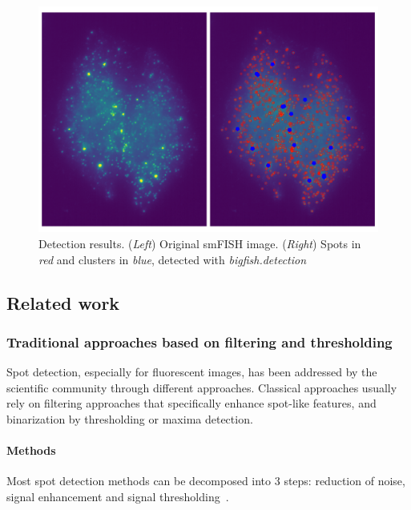 \begin{figure}[]
    \centering
    \includegraphics[width=1\textwidth]{figures/chapter2/cluster_detection_results}
	\caption[Example of spot detection results]{Detection results.
	(\textit{Left}) Original smFISH image.
	(\textit{Right}) Spots in \textit{red} and clusters in \textit{blue}, detected with \emph{bigfish.detection}}
    \label{fig:detection_results}
\end{figure}

\subsection{Related work}
\label{subsec:detection_related_work}

\subsubsection{Traditional approaches based on filtering and thresholding}

Spot detection, especially for fluorescent images, has been addressed by the scientific community through different approaches.
Classical approaches usually rely on filtering approaches that specifically enhance spot-like features, and binarization by thresholding or maxima detection.

\paragraph{Methods}

Most spot detection methods can be decomposed into 3 steps: reduction of noise, signal enhancement and signal thresholding~\cite{smal_quantitative_2010}.

